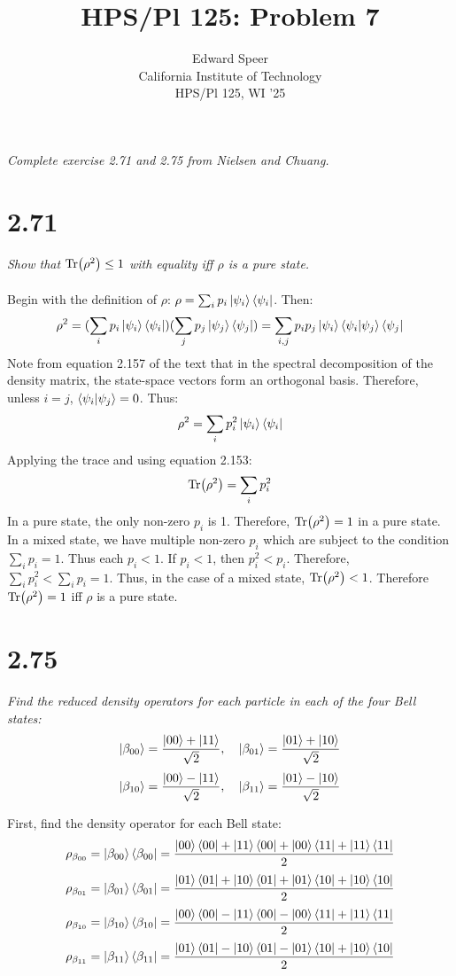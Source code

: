 \documentclass[11pt, a4paper]{article}
\title{HPS/Pl 125: Problem 7}
\author{%
  Edward Speer
  \\
  California Institute of Technology\\
  HPS/Pl 125, WI '25 \\
}
\date{\monthyeardate}
\begin{document}
\maketitle

\noindent \emph{Complete exercise 2.71 and 2.75 from Nielsen and Chuang.}

\section{2.71} \emph{Show that $\Tr(\rho^2) \leq 1$ with equality iff $\rho$ is
a pure state.}
\\ \hfill \\
Begin with the definition of $\rho$: $\rho = \sum_{i}p_i\ket{\psi_i}\bra{\psi_i}$.
Then:
\[\rho^2 = (\sum_{i}p_i\ket{\psi_i}\bra{\psi_i})(\sum_{j}p_j\ket{\psi_j}\bra{\psi_j}) = \sum_{i, j}p_ip_j\ket{\psi_i}\bra{\psi_i}\ket{\psi_j}\bra{\psi_j}\]
Note from equation 2.157 of the text that in the spectral decomposition of the 
density matrix, the state-space vectors form an orthogonal basis. Therefore,
unless $i = j$, $\bra{\psi_i}\ket{\psi_j} = 0$. Thus:
\[\rho^2 = \sum_{i}p_i^2\ket{\psi_i}\bra{\psi_i}\]
Applying the trace and using equation 2.153:
\[\Tr(\rho^2) = \sum_{i}p_i^2\]
In a pure state, the only non-zero $p_i$ is 1. Therefore, $\Tr(\rho^2) = 1$ in a
pure state. In a mixed state, we have multiple non-zero $p_i$ which are subject
to the condition $\sum_{i}p_i = 1$. Thus each $p_i < 1$. If $p_i < 1$, then 
$p_i^2 < p_i$. Therefore, $\sum_{i}p_i^2 < \sum_{i}p_i = 1$. Thus, in the case
of a mixed state, $\Tr(\rho^2) < 1$. Therefore $\Tr(\rho^2) = 1$ iff $\rho$ is a
pure state.

\section{2.75} \emph{Find the reduced density operators for each particle in
each of the four Bell states:
\[\ket{\beta_{00}} = \frac{\ket{00} + \ket{11}}{\sqrt{2}},\quad\ket{\beta_{01}} = \frac{\ket{01} + \ket{10}}{\sqrt{2}}\]
\[\ket{\beta_{10}} = \frac{\ket{00} - \ket{11}}{\sqrt{2}},\quad\ket{\beta_{11}} = \frac{\ket{01} - \ket{10}}{\sqrt{2}}\]
}

First, find the density operator for each Bell state:
\[\rho_{\beta_{00}} = \ket{\beta_{00}}\bra{\beta_{00}} = \frac{\ket{00}\bra{00} + \ket{11}\bra{00} + \ket{00}\bra{11} + \ket{11}\bra{11}}{2}\]
\[\rho_{\beta_{01}} = \ket{\beta_{01}}\bra{\beta_{01}} = \frac{\ket{01}\bra{01} + \ket{10}\bra{01} + \ket{01}\bra{10} + \ket{10}\bra{10}}{2}\]
\[\rho_{\beta_{10}} = \ket{\beta_{10}}\bra{\beta_{10}} = \frac{\ket{00}\bra{00} - \ket{11}\bra{00} - \ket{00}\bra{11} + \ket{11}\bra{11}}{2}\]
\[\rho_{\beta_{11}} = \ket{\beta_{11}}\bra{\beta_{11}} = \frac{\ket{01}\bra{01} - \ket{10}\bra{01} - \ket{01}\bra{10} + \ket{10}\bra{10}}{2}\]
\end{document}
